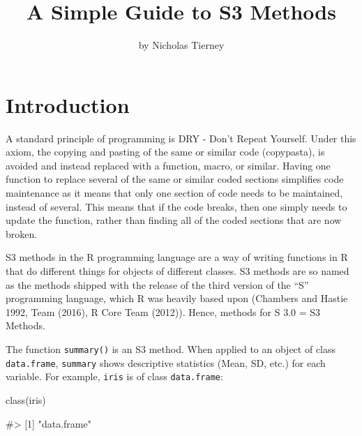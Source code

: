 \title{A Simple Guide to S3 Methods}
\author{by Nicholas Tierney}

\maketitle


\section{Introduction}\label{introduction}

A standard principle of programming is DRY - Don't Repeat Yourself.
Under this axiom, the copying and pasting of the same or similar code
(copypasta), is avoided and instead replaced with a function, macro, or
similar. Having one function to replace several of the same or similar
coded sections simplifies code maintenance as it means that only one
section of code needs to be maintained, instead of several. This means
that if the code breaks, then one simply needs to update the function,
rather than finding all of the coded sections that are now broken.

S3 methods in the R programming language are a way of writing functions
in R that do different things for objects of different classes. S3
methods are so named as the methods shipped with the release of the
third version of the ``S'' programming language, which R was heavily
based upon (Chambers and Hastie 1992, Team (2016), R Core Team (2012)).
Hence, methods for S 3.0 = S3 Methods.

The function \texttt{summary()} is an S3 method. When applied to an
object of class \texttt{data.frame}, \texttt{summary} shows descriptive
statistics (Mean, SD, etc.) for each variable. For example,
\texttt{iris} is of class \texttt{data.frame}:

\begin{Schunk}
\begin{Sinput}
class(iris)
\end{Sinput}
\begin{Soutput}
#> [1] "data.frame"
\end{Soutput}
\end{Schunk}

